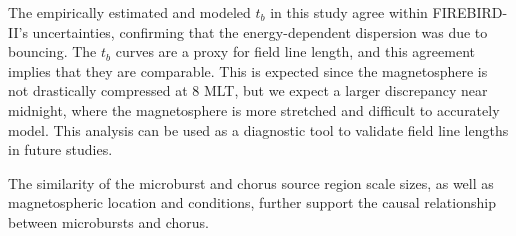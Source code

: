 \documentclass[draft, linenumbers]{agujournal}
\begin{document}
The empirically estimated and modeled $t_b$ in this study agree within FIREBIRD-II's uncertainties, confirming that the energy-dependent dispersion was due to bouncing. The $t_b$ curves are a proxy for field line length, and this agreement implies that they are comparable. This is expected since the magnetosphere is not drastically compressed at 8 MLT, but we expect a larger discrepancy near midnight, where the magnetosphere is more stretched and difficult to accurately model. This analysis can be used as a diagnostic tool to validate field line lengths in future studies.

The similarity of the microburst and chorus source region scale sizes, as well as magnetospheric location and conditions, further support the causal relationship between microbursts and chorus.






%
%
%
%
%
%
%
%
\end{document}
